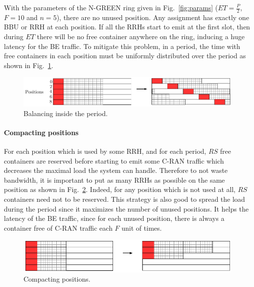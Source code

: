 \documentclass[10pt, conference, letterpaper]{IEEEtran}
\begin{document}
With the parameters of the N-GREEN ring given in Fig.~\ref{fig:params} ($ET = \frac{P}{2}$, $F = 10$ and $n = 5$), there are no unused position. Any assignment has exactly one  BBU or RRH at each position. If all the RRHs start to emit at the first slot, then during $ET$ there will be no free container anywhere on the ring, inducing a huge latency for the BE traffic. 
To mitigate this problem, in a period, the time with free containers in each position must be uniformly distributed over the period as shown in Fig.~\ref{fig:periodbal}.
\begin{figure}[h!]
\begin{center}   

      \includegraphics[scale=0.55]{repart2}
     \caption{Balancing inside the period.}\label{fig:periodbal}
     
\end{center}
  \end{figure}  
  

  
\paragraph{Compacting positions}

For each position which is used by some RRH, and for each period, $RS$ free containers are reserved before starting to emit some C-RAN traffic which decreases the maximal load the system can handle. Therefore to not waste bandwidth, it is important to put as many RRHs as possible on the same position as shown in Fig.~\ref{fig:packing}. Indeed, for any position which is not used at all, $RS$ containers need not to be reserved. This strategy is also good to spread the load during the period since it maximizes the number of unused positions.
It helps the latency of the BE traffic, since for each unused position, there is always a container free of C-RAN traffic each $F$ unit of times. 
\begin{figure}[h!]
\begin{center}   

      \includegraphics[scale=0.5]{repart0}
     \caption{Compacting positions.}\label{fig:packing}
     
\end{center}
  \end{figure}
  
\end{document}
